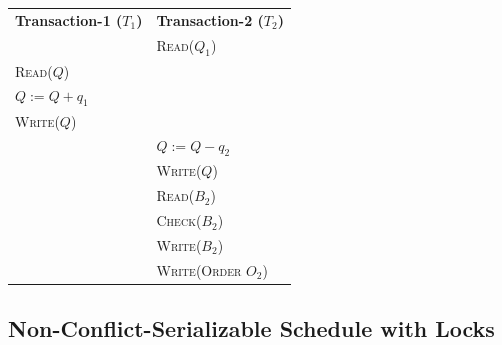 \documentclass[12pt]{report}
\begin{document}
    \begin{center}
        \begin{adjustbox}{width=\textwidth}
            \begin{tabularx}{\textwidth}{|X|X|}
            \hline
            \multirow{2}{*}{\textbf{Transaction-1 ($T_{1}$)}} & \multirow{2}{*}{\textbf{Transaction-2 ($T_{2}$)}} \\
            & \\ \hline
            & \textsc{Read($Q_{1}$)} \\
            \textsc{Read($Q$)} & \\
            \textsc{$Q := Q + q_{1}$} & \\
            \textsc{Write($Q$)} & \\
            & \textsc{$Q := Q - q_{2}$} \\
            & \textsc{Write($Q$)} \\
            & \textsc{Read($B_{2}$)} \\
            & \textsc{Check($B_{2}$)} \\
            & \textsc{Write($B_{2}$)} \\
            & \textsc{Write(Order $O_{2}$)} \\
            \hline
            \end{tabularx}
        \end{adjustbox}
    \end{center}
    \pagebreak

    \subsection*{Non-Conflict-Serializable Schedule with Locks}
\end{document}
